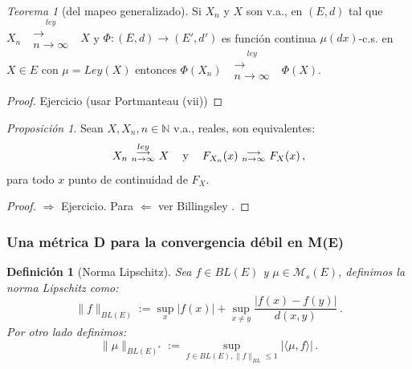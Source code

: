 \documentclass[letterpaper,11pt]{article} %
\def\espacio{\hspace{.25cm}\,}
\theoremstyle{defbreak}
\newtheorem{definition}{Definición}[subsection]
\theoremstyle{propbreak}
\theoremstyle{remark}
\newtheorem{remark}{Observación}[subsection]
\theoremstyle{break}
\newtheorem{theorem}{Teorema}[subsection]
\newtheorem{proposition}{Proposición}[subsection]
\def\N{\mathbb{N}}
\def\gris{\color{mygray}}
\def\negro{\color{black}}
\begin{document}
\begin{theorem}[del mapeo generalizado]
Si $X_n$ y $X$ son v.a., en $(E,d)$ tal que $X_n\mbox{ }\overset{ley}{\substack{\longrightarrow \\n \to \infty}}\mbox{ }X$ y $\Phi:(E,d)\longrightarrow (E',d')$ es función continua $\mu(dx)$-c.s. en $X\in E$ con $\mu=Ley(X)$ entonces $\Phi(X_n)\mbox{ }\overset{ley}{\substack{\longrightarrow \\n \to \infty}}\mbox{ }\Phi(X)$.
\end{theorem}
\begin{proof}
\color{blue}Ejercicio (usar Portmanteau (vii)) \color{black}
\end{proof}

\begin{proposition}
Sean $X,X_n,n\in\N$ v.a., reales, son equivalentes:
$$X_n\mbox{ }\overset{ley}{\substack{\longrightarrow \\n \to \infty}}\mbox{ }X \espacio \mbox{ y }\espacio F_{X_n}(x) \mbox{ }\substack{\longrightarrow \\ n\to\infty}\mbox{ } F_X(x)\, ,$$
para todo $x$ punto de continuidad de $F_X$.
\end{proposition}
\begin{proof}
\color{blue}$\Rightarrow$ Ejercicio. \gris Para $\Leftarrow$ ver Billingsley \cite{billing}. \negro
\end{proof}

\subsubsection{Una métrica D para la convergencia débil en M(E)}
\begin{definition}[Norma Lipschitz]
Sea $f\in BL(E)$ y $\mu\in \mathcal{M}_s(E)$, definimos la norma Lipschitz como:
$$\displaystyle \|f\|_{BL(E)} := \sup_x|f(x)|+\sup_{x\neq y}\frac{|f(x)-f(y)|}{d(x,y)} \, .$$
Por otro lado definimos:
$$\|\mu\|_{BL(E)^*} := \displaystyle\sup_{f\in BL(E),\|f\|_{BL}\leq 1}|\langle \mu,f\rangle| \, .$$
\end{definition}
\end{document}
